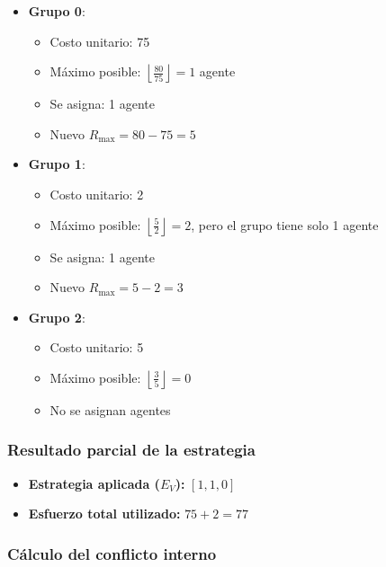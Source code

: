 \documentclass[11pt,letter]{article}
\begin{document}
\begin{itemize}
    \item \textbf{Grupo 0}:
        \begin{itemize}
            \item Costo unitario: 75
            \item Máximo posible: $\left\lfloor \frac{80}{75} \right\rfloor = 1$ agente
            \item Se asigna: 1 agente
            \item Nuevo $R_{\text{max}} = 80 - 75 = 5$
        \end{itemize}

    \item \textbf{Grupo 1}:
        \begin{itemize}
            \item Costo unitario: 2
            \item Máximo posible: $\left\lfloor \frac{5}{2} \right\rfloor = 2$, pero el grupo tiene solo 1 agente
            \item Se asigna: 1 agente
            \item Nuevo $R_{\text{max}} = 5 - 2 = 3$
        \end{itemize}

    \item \textbf{Grupo 2}:
        \begin{itemize}
            \item Costo unitario: 5
            \item Máximo posible: $\left\lfloor \frac{3}{5} \right\rfloor = 0$
            \item No se asignan agentes
        \end{itemize}
\end{itemize}

\subsubsection*{Resultado parcial de la estrategia}

\begin{itemize}
    \item \textbf{Estrategia aplicada ($E_V$): } $[1, 1, 0]$
    \item \textbf{Esfuerzo total utilizado:} $75 + 2 = 77$
\end{itemize}

\subsubsection*{Cálculo del conflicto interno}
\end{document}
